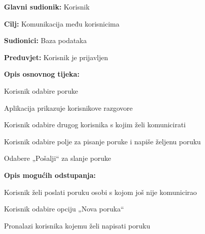 				\noindent {}
			\begin{packed_item}
				
				\item \textbf{Glavni sudionik: }Korisnik
				\item  \textbf{Cilj:} Komunikacija među korisnicima
				\item  \textbf{Sudionici:} Baza podataka
				\item  \textbf{Preduvjet:} Korisnik je prijavljen
				\item  \textbf{Opis osnovnog tijeka:}
				
				\item[] \begin{packed_enum}
					
					\item Korisnik odabire poruke
					\item Aplikacija prikazuje korisnikove razgovore
					\item Korisnik odabire drugog korisnika s kojim želi komunicirati
					\item Korisnik odabire polje za pisanje poruke i napiše željenu poruku
					\item Odabere „Pošalji“ za slanje poruke
				\end{packed_enum}
				
				\item  \textbf{Opis mogućih odstupanja:}
				
				\item[] \begin{packed_item}
					
					\item[3.a] Korisnik želi poslati poruku osobi s kojom još nije komunicirao
					\item[] \begin{packed_enum}
						\item Korisnik odabire opciju „Nova poruka“
						\item Pronalazi korisnika kojemu želi napisati poruku
					\end{packed_enum}
				\end{packed_item}
			\end{packed_item}
			
